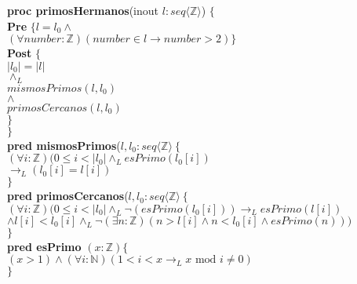 \documentclass[a4paper]{article}
\begin{document}
			\textbf{proc primosHermanos}(inout $l:seq\langle \mathbb{Z}\rangle$) $\{$\smallskip \\
			\hspace*{6mm} \textbf{Pre }$\{l=l_0 \wedge$\\
			\hspace*{6mm} $(\forall number:\mathbb{Z})(number\in l \rightarrow
			 number>2)\}$\smallskip \\
			\hspace*{6mm} \textbf{Post }$\{$\\
			\hspace*{6mm} $|l_0|=|l|$\\
			\hspace*{6mm} $\wedge_L$\\
			\hspace*{6mm} $mismosPrimos(l,l_0 )$\\
			\hspace*{6mm} $\wedge$\\
			\hspace*{6mm} $primosCercanos(l,l_0)$\\
			\hspace*{6mm} $\}$\\
			\hspace*{5mm}$\}$\smallskip \\
			
			\textbf{pred mismosPrimos}($l,l_0: seq\langle\mathbb{Z}\rangle
			\ \{$\smallskip \\
			\hspace*{6mm}$(\forall i:\mathbb{Z})(0\leq i < |l_0|\wedge_L esPrimo(l_0[i])$\\
			\hspace*{6mm}$\rightarrow_L(l_0[i]=l[i])$\\
			\hspace*{5mm}$\}$\smallskip \\
			
			\textbf{pred primosCercanos}($l,l_0: seq\langle\mathbb{Z}\rangle
			\ \{$\smallskip \\
			\hspace*{6mm}$(\forall i:\mathbb{Z})(0\leq i<|l_0|\wedge_L\neg(esPrimo(l_0[i]))
			\rightarrow_L esPrimo(l[i])$\\
			\hspace*{6mm}$\wedge l[i]<l_0[i]\wedge_L \neg(\exists n:\mathbb{Z})(n>l[i]\wedge
			n<l_0[i]\wedge esPrimo(n)))$\\
			\hspace*{5mm}$\}$\smallskip \\
			
			\textbf{pred esPrimo} $(x: \mathbb{Z})\{$\\ 
			\hspace*{6mm}$ (x > 1)\wedge(\forall i :\mathbb{N})
			(1<i<x \rightarrow _L x\textrm{ mod }i\neq 0 )$\\
			\hspace*{5mm}$\}$
\end{document}
